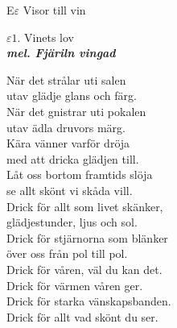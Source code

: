 \documentclass[a6paper,10pt]{article}
\newcommand{\mel}[1]{\small\textbf{\textit{mel. #1 \\}}}
\begin{document}
\noindent
\huge{E$\varepsilon$ Visor till vin}
\begin{center}
\Large $\varepsilon1$. Vinets lov \\ 
\mel{Fjäriln vingad}
\end{center}
\small När det strålar uti salen\\
utav glädje glans och färg.\\
När det gnistrar uti pokalen\\
utav ädla druvors märg.
\vspace{5pt}\\
Kära vänner varför dröja\\
med att dricka glädjen till.\\
Låt oss bortom framtids slöja\\
se allt skönt vi skåda vill.
\vspace{5pt}\\
Drick för allt som livet skänker,\\
glädjestunder, ljus och sol.\\
Drick för stjärnorna som blänker\\
över oss från pol till pol.
\vspace{5pt}\\
Drick för våren, väl du kan det.\\
Drick för värmen våren ger.\\
Drick för starka vänskapsbanden.\\
Drick för allt vad skönt du ser.
\end{document}
